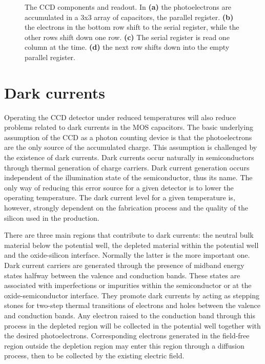\begin{figure}[htpb]
\begin{subfigure}[t]{0.25\textwidth}
		\caption{}
		\label{fig:ccd-registry-6}
	\end{subfigure}
	\caption{The CCD components and readout. In \textbf{(a)} the photoelectrons
	are accumulated in a 3x3 array of capacitors, the parallel register.
	\textbf{(b)} the electrons in the bottom row shift to the serial register,
	while the other rows shift down one row. \textbf{(c)} The serial register is
	read one column at the time. \textbf{(d)} the next row shifts down into the
empty parallel register.}
	\label{fig:ccd-registry}
\end{figure}

\section{Dark currents}

Operating the CCD detector under reduced temperatures will also reduce
problems related to dark currents in the MOS capacitors. The basic
underlying assumption of the CCD as a photon counting device is that
the photoelectrons are the only source of the accumulated charge. This
assumption is challenged by the existence of dark currents. Dark
currents occur naturally in semiconductors through thermal generation
of charge carriers. Dark current generation occurs independent of the
illumination state of the semiconductor, thus its name. The only way
of reducing this error source for a given detector is to lower the
operating temperature. The dark current level for a given temperature
is, however, strongly dependent on the fabrication process and the
quality of the silicon used in the production.

There are three main regions that contribute to dark currents: the
neutral bulk material below the potential well, the depleted material
within the potential well and the oxide-silicon interface. Normally
the latter is the more important one. Dark current carriers are
generated through the presence of midband energy states halfway
between the valence and conduction bands. These states are associated
with imperfections or impurities within the semiconductor or at the
oxide-semiconductor interface. They promote dark currents by acting as
stepping stones for two-step thermal transitions of electrons and
holes between the valence and conduction bands. Any electron raised to
the conduction band through this process in the depleted region will
be collected in the potential well together with the desired
photoelectrons. Corresponding electrons generated in the field-free
region outside the depletion region may enter this region through a
diffusion process, then to be collected by the existing electric field.
 
